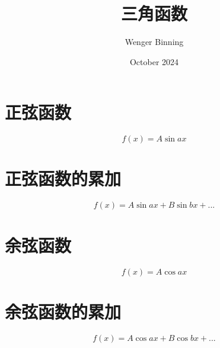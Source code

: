 \documentclass{article}
\title{三角函数}
\author{Wenger Binning }
\date{October 2024}
\begin{document}
\maketitle

\section{正弦函数}

$$ f(x) = A \sin ax $$

\section{正弦函数的累加}

$$ f(x) = A \sin ax + B \sin bx + ... $$

\section{余弦函数}

$$ f(x) = A \cos ax $$

\section{余弦函数的累加}

$$ f(x) = A \cos ax + B \cos bx + ... $$
\end{document}

